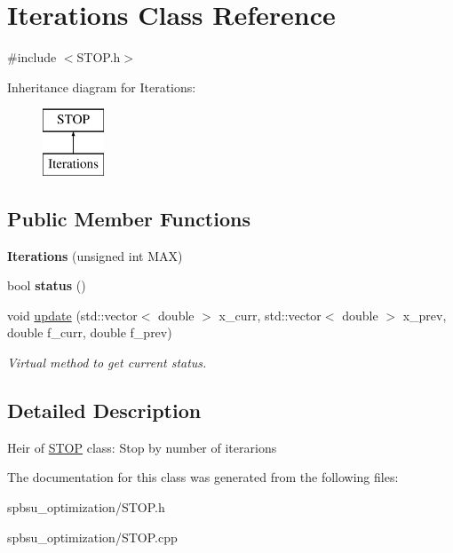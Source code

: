 \hypertarget{class_iterations}{}\section{Iterations Class Reference}
\label{class_iterations}


{\ttfamily \#include $<$S\+T\+O\+P.\+h$>$}

Inheritance diagram for Iterations\+:\begin{figure}[H]
\begin{center}
\leavevmode
\includegraphics[height=2.000000cm]{class_iterations}
\end{center}
\end{figure}
\subsection*{Public Member Functions}
\begin{DoxyCompactItemize}
\item 
\mbox{\label{class_iterations_a3f0d022e3d5a6b45cb7290ff29d01094}} 
{\bfseries Iterations} (unsigned int M\+AX)
\item 
\mbox{\label{class_iterations_a13cee8a7022840c41fd409a489eed513}} 
bool {\bfseries status} ()
\item 
\mbox{\label{class_iterations_a04b7ede17968ac58df5e36bbd683e37e}} 
void \hyperlink{class_iterations_a04b7ede17968ac58df5e36bbd683e37e}{update} (std\+::vector$<$ double $>$ x\+\_\+curr, std\+::vector$<$ double $>$ x\+\_\+prev, double f\+\_\+curr, double f\+\_\+prev)
\begin{DoxyCompactList}\small\item\em Virtual method to get current status. \end{DoxyCompactList}\end{DoxyCompactItemize}


\subsection{Detailed Description}
Heir of \hyperlink{class_s_t_o_p}{S\+T\+OP} class\+: Stop by number of iterarions 

The documentation for this class was generated from the following files\+:\begin{DoxyCompactItemize}
\item 
spbsu\+\_\+optimization/S\+T\+O\+P.\+h\item 
spbsu\+\_\+optimization/S\+T\+O\+P.\+cpp\end{DoxyCompactItemize}

